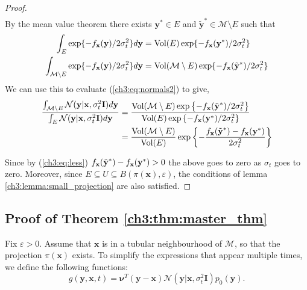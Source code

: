 \begin{proof}
\begin{gather}
\end{gather}
By the mean value theorem there exists $\textbf{y}^*\in E$ and $\tilde{\textbf{y}}^*\in \mathcal{M} \setminus E$ such that 
\begin{align*}
    \int_E \exp \{{-f_\textup{\textbf{x}}(\textbf{y})/2\sigma_t^2} \}d\textbf{y} &= \text{Vol}(E)\exp\{-f_\textup{\textbf{x}}(\textbf{y}^*)/2\sigma_t^2 \} \\
    \int_{\mathcal{M} \setminus E} \exp \{{-f_\textup{\textbf{x}}(\textbf{y})/2\sigma_t^2} \}d\textbf{y} &= \text{Vol}(\mathcal{M} \setminus E)\exp\{-f_\textup{\textbf{x}}(\tilde{\textbf{y}}^*)/2\sigma_t^2 \}
\end{align*}
We can use this to evaluate (\ref{ch3:eq:normals2}) to give,
\begin{align*}
    \frac{\int_{\mathcal{M} \setminus E}\mathcal{N}(\textbf{y} | \textbf{x}, \sigma^2_t\textbf{I}) d\textbf{y}}{ \int_E \mathcal{N}(\textbf{y} | \textbf{x}, \sigma^2_t\textbf{I}) d\textbf{y}} 
    &= \frac{\text{Vol}(\mathcal{M} \setminus E) \exp \left\{-f_\textup{\textbf{x}}(\tilde{\textbf{y}}^*) / 2 \sigma_t^2\right\}}{\text{Vol}(E) \exp \left\{-f_\textup{\textbf{x}}(\textbf{y}^*) / 2 \sigma_t^2 \right\}} \\
    &= \frac{\text{Vol}(\mathcal{M} \setminus E)}{\text{Vol}(E)} \exp \left\{- \frac{f_\textup{\textbf{x}}(\tilde{\textbf{y}}^*) - f_\textup{\textbf{x}}(\textbf{y}^*)}{2 \sigma_t^2}\right\}
\end{align*}

Since by (\ref{ch3:eq:less}) $f_\textup{\textbf{x}}(\tilde{\textbf{y}}^*) - f_\textup{\textbf{x}}(\textbf{y}^*) > 0$  the above goes to zero as $\sigma_t$ goes to zero. Moreover, since $E \subseteq U \subseteq B(\pi(\textbf{x}), \varepsilon)$, the conditions of lemma \ref{ch3:lemma:small_projection} are also satisfied.
\end{proof}

\subsection*{Proof of Theorem \ref{ch3:thm:master_thm}}

Fix $\varepsilon > 0$. Assume that $\textbf{x}$ is in a tubular neighbourhood of $\mathcal{M}$, so that the projection $\pi(\textbf{x})$ exists. To simplify the expressions that appear multiple times, we define the following functions:
\[
g(\textbf{y}, \textbf{x}, t) = \boldsymbol{\nu}^T (\textbf{y}-\textbf{x}) \mathcal{N}(\textbf{y} | \textbf{x}, \sigma^2_t \textbf{I}) p_0(\textbf{y}).
\]

